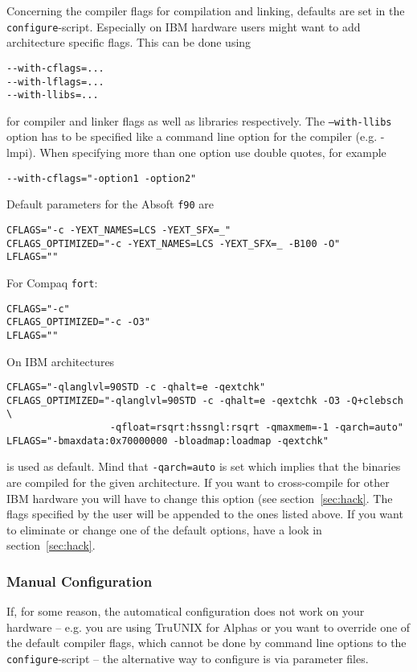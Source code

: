 \documentclass[a4paper,10pt]{article}
\begin{document}
Concerning the compiler flags for compilation and linking, defaults are set in
the \texttt{configure}-script.  Especially on IBM hardware users might want to
add architecture specific flags. This can be done using
\begin{verbatim}
--with-cflags=...
--with-lflags=...
--with-llibs=...
\end{verbatim}
for compiler and linker flags as well as libraries respectively. The
\texttt{--with-llibs} option has to be specified like a command line option for
the compiler (e.g. -lmpi).  When specifying more than one option use double
quotes, for example
\begin{verbatim}
--with-cflags="-option1 -option2"
\end{verbatim}
Default parameters for the Absoft \texttt{f90} are
\begin{verbatim}
CFLAGS="-c -YEXT_NAMES=LCS -YEXT_SFX=_"
CFLAGS_OPTIMIZED="-c -YEXT_NAMES=LCS -YEXT_SFX=_ -B100 -O"
LFLAGS=""
\end{verbatim}
For Compaq \texttt{fort}:
\begin{verbatim}
CFLAGS="-c"
CFLAGS_OPTIMIZED="-c -O3"
LFLAGS=""
\end{verbatim}
On IBM architectures 
\begin{verbatim}
CFLAGS="-qlanglvl=90STD -c -qhalt=e -qextchk"
CFLAGS_OPTIMIZED="-qlanglvl=90STD -c -qhalt=e -qextchk -O3 -Q+clebsch \
                  -qfloat=rsqrt:hssngl:rsqrt -qmaxmem=-1 -qarch=auto"
LFLAGS="-bmaxdata:0x70000000 -bloadmap:loadmap -qextchk"
\end{verbatim}
is used as default. Mind that \texttt{-qarch=auto} is set which implies that
the binaries are compiled for the given architecture. If you want to
cross-compile for other IBM hardware you will have to change this option (see
section~\ref{sec:hack}.  The flags specified by the user will be appended to
the ones listed above.  If you want to eliminate or change one of the default
options, have a look in section~\ref{sec:hack}.

\subsubsection*{Manual Configuration}
\label{sub:parms}

If, for some reason, the automatical configuration does not work on your
hardware -- e.g. you are using TruUNIX for Alphas or you want to override one
of the default compiler flags, which cannot be done by command line options to
the \texttt{configure}-script -- the alternative way to configure is via
parameter files.
\end{document}
